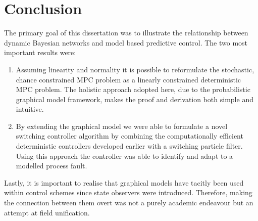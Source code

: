 \section{Conclusion}
The primary goal of this dissertation was to illustrate the relationship between dynamic Bayesian networks and model based predictive control. The two most important results were:
\begin{enumerate}
\item
Assuming linearity and normality it is possible to reformulate the stochastic, chance constrained MPC problem as a linearly constrained deterministic MPC problem. The holistic approach adopted here, due to the probabilistic graphical model framework, makes the proof and derivation both simple and intuitive.
\item
By extending the graphical model we were able to formulate a novel switching controller algorithm by combining the computationally efficient deterministic controllers developed earlier with a switching particle filter. Using this approach the controller was able to identify and adapt to a modelled process fault.
\end{enumerate} 
Lastly, it is important to realise that graphical models have tacitly been used within control schemes since state observers were introduced. Therefore, making the connection between them overt was not a purely academic endeavour but an attempt at field unification.